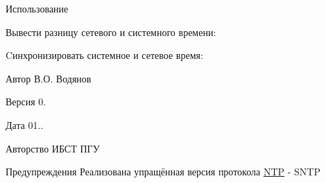 Использование

Вывести разницу сетевого и системного времени\+: 
\begin{DoxyCode}{0}
\end{DoxyCode}
 Cинхронизировать системное и сетевое время\+: 
\begin{DoxyCode}{0}
\end{DoxyCode}
 \begin{DoxyAuthor}{Автор}
В.\+О. Водянов 
\end{DoxyAuthor}
\begin{DoxyVersion}{Версия}
0. 
\end{DoxyVersion}
\begin{DoxyDate}{Дата}
01.. 
\end{DoxyDate}
\begin{DoxyCopyright}{Авторство}
ИБСТ ПГУ 
\end{DoxyCopyright}
\begin{DoxyWarning}{Предупреждения}
Реализована упращённая версия протокола \mbox{\hyperlink{classNTP}{N\+TP}} -\/ S\+N\+TP 
\end{DoxyWarning}
